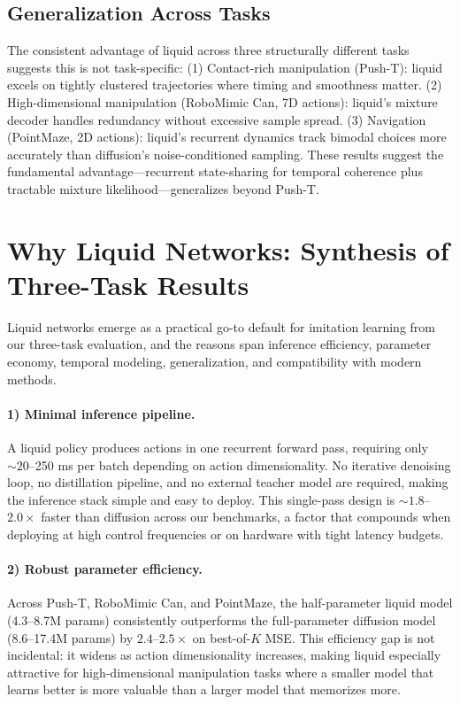 \documentclass{article}
\begin{document}
\subsection{Generalization Across Tasks}

The consistent advantage of liquid across three structurally different tasks suggests this is not task-specific: (1) Contact-rich manipulation (Push-T): liquid excels on tightly clustered trajectories where timing and smoothness matter. (2) High-dimensional manipulation (RoboMimic Can, 7D actions): liquid's mixture decoder handles redundancy without excessive sample spread. (3) Navigation (PointMaze, 2D actions): liquid's recurrent dynamics track bimodal choices more accurately than diffusion's noise-conditioned sampling. These results suggest the fundamental advantage---recurrent state-sharing for temporal coherence plus tractable mixture likelihood---generalizes beyond Push-T.

\section{Why Liquid Networks: Synthesis of Three-Task Results}

Liquid networks emerge as a practical go-to default for imitation learning from our three-task evaluation, and the reasons span inference efficiency, parameter economy, temporal modeling, generalization, and compatibility with modern methods.

\paragraph{1) Minimal inference pipeline.}
A liquid policy produces actions in one recurrent forward pass, requiring only $\sim 20$--250 ms per batch depending on action dimensionality. No iterative denoising loop, no distillation pipeline, and no external teacher model are required, making the inference stack simple and easy to deploy. This single-pass design is $\sim 1.8$--$2.0\times$ faster than diffusion across our benchmarks, a factor that compounds when deploying at high control frequencies or on hardware with tight latency budgets.

\paragraph{2) Robust parameter efficiency.}
Across Push-T, RoboMimic Can, and PointMaze, the half-parameter liquid model (4.3--8.7M params) consistently outperforms the full-parameter diffusion model (8.6--17.4M params) by $2.4$--$2.5\times$ on best-of-$K$ MSE. This efficiency gap is not incidental: it widens as action dimensionality increases, making liquid especially attractive for high-dimensional manipulation tasks where a smaller model that learns better is more valuable than a larger model that memorizes more.
\end{document}
